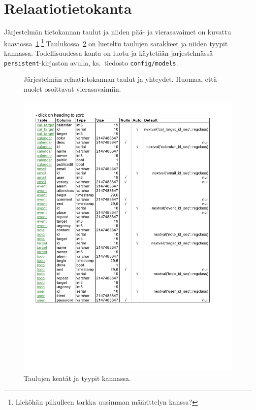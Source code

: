 \documentclass[a4paper,12pt]{report}
\begin{document}
\section{Relaatiotietokanta}
Järjestelmän tietokannan taulut ja niiden pää- ja vierasavaimet on kuvattu
kaaviossa~\ref{graph_database}.\footnote{Lieköhän pilkulleen tarkka uusimman määrittelyn kanssa?}
Taulukossa~\ref{graph_columns} on lueteltu
taulujen sarakkeet ja niiden tyypit kannassa. Todellisuudessa kanta on luotu ja
käytetään jarjestelmässä \texttt{persistent}-kirjaston avulla, ks.~tiedosto
\texttt{config/models}.
\begin{figure}[hb]
   \centering
   \caption{Järjestelmän relaatietokannan taulut ja yhteydet. Huomaa, että
   nuolet osoittavat vierasavaimiin.}
   \label{graph_database}
\end{figure}
\begin{figure}[ht]
   \centering
   \includegraphics[clip,trim=1.2cm 7.05cm 9.21cm 1.81cm]{columns.pdf}
   \caption{Taulujen kentät ja tyypit kannassa.}
   \label{graph_columns}
\end{figure}
\clearpage
\end{document}
